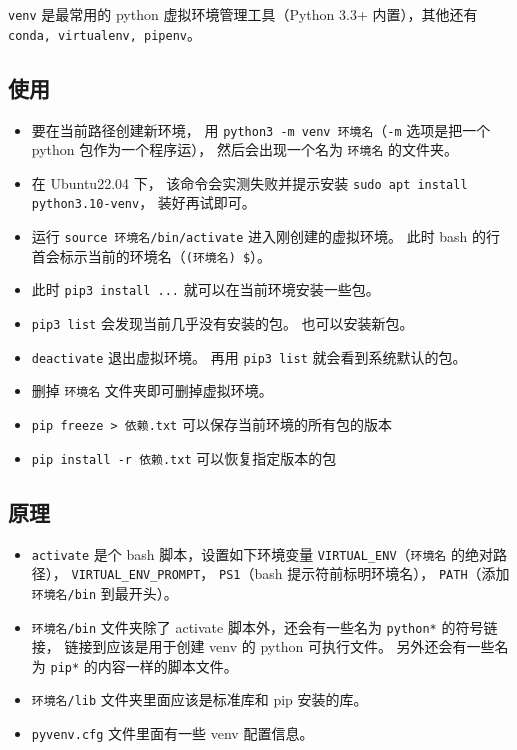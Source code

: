 
\begin{issues}
\issueDraft
\end{issues}


\verb`venv` 是最常用的 python 虚拟环境管理工具（Python 3.3+ 内置），其他还有 \verb`conda, virtualenv, pipenv`。

\subsection{使用}
\begin{itemize}
\item 要在当前路径创建新环境， 用 \verb`python3 -m venv 环境名`（\verb`-m` 选项是把一个 python 包作为一个程序运）， 然后会出现一个名为 \verb`环境名` 的文件夹。
\item 在 Ubuntu22.04 下， 该命令会实测失败并提示安装 \verb`sudo apt install python3.10-venv`， 装好再试即可。
\item 运行 \verb`source 环境名/bin/activate` 进入刚创建的虚拟环境。 此时 bash 的行首会标示当前的环境名（\verb`(环境名) $`）。
\item 此时 \verb`pip3 install ...` 就可以在当前环境安装一些包。
\item \verb`pip3 list` 会发现当前几乎没有安装的包。 也可以安装新包。
\item \verb`deactivate` 退出虚拟环境。 再用 \verb`pip3 list` 就会看到系统默认的包。
\item 删掉 \verb`环境名` 文件夹即可删掉虚拟环境。
\item \verb`pip freeze > 依赖.txt` 可以保存当前环境的所有包的版本
\item \verb`pip install -r 依赖.txt` 可以恢复指定版本的包
\end{itemize}

\subsection{原理}
\begin{itemize}
\it
\item \verb`activate` 是个 bash 脚本，设置如下环境变量 \verb`VIRTUAL_ENV`（\verb`环境名` 的绝对路径）， \verb`VIRTUAL_ENV_PROMPT`， \verb`PS1`（bash 提示符前标明环境名）， \verb`PATH`（添加 \verb`环境名/bin` 到最开头）。
\item \verb`环境名/bin` 文件夹除了 activate 脚本外，还会有一些名为 \verb`python*` 的符号链接， 链接到应该是用于创建 venv 的 python 可执行文件。 另外还会有一些名为 \verb`pip*` 的内容一样的脚本文件。
\item \verb`环境名/lib` 文件夹里面应该是标准库和 pip 安装的库。
\item \verb`pyvenv.cfg` 文件里面有一些 venv 配置信息。
\end{itemize}

